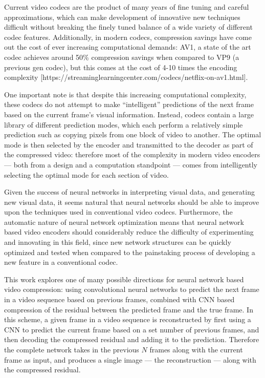 \documentclass[10pt,twocolumn,letterpaper]{article}
\begin{document}
Current video codecs are the product of many years of fine tuning and careful approximations, which can make development of innovative new techniques difficult without breaking the finely tuned balance of a wide variety of different codec features. Additionally, in modern codecs, compression savings have come out the cost of ever increasing computational demands: AV1, a state of the art codec achieves around 50\% compression savings when compared to VP9 (a previous gen codec), but this comes at the cost of 4-10 times the encoding complexity [https://streaminglearningcenter.com/codecs/netflix-on-av1.html].

One important note is that despite this increasing computational complexity, these codecs do not attempt to make ``intelligent'' predictions of the next frame based on the current frame's visual information. Instead, codecs contain a large library of different prediction modes, which each perform a relatively simple prediction such as copying pixels from one block of video to another. The optimal mode is then selected by the encoder and transmitted to the decoder as part of the compressed video: therefore most of the complexity in modern video encoders --- both from a design and a computation standpoint --- comes from intelligently selecting the optimal mode for each section of video.

Given the success of neural networks in interpreting visual data, and generating new visual data, it seems natural that neural networks should be able to improve upon the techniques used in conventional video codecs. Furthermore, the automatic nature of neural network optimization means that neural network based video encoders should considerably reduce the difficulty of experimenting and innovating in this field, since new network structures can be quickly optimized and tested when compared to the painstaking process of developing a new feature in a conventional codec.

This work explores one of many possible directions for neural network based video compression: using convolutional neural networks to predict the next frame in a video sequence based on previous frames, combined with CNN based compression of the residual between the predicted frame and the true frame. In this scheme, a given frame in a video sequence is reconstructed by first using a CNN to predict the current frame based on a set number of previous frames, and then decoding the compressed residual and adding it to the prediction. Therefore the complete network takes in the previous $N$ frames along with the current frame as input, and produces a single image --- the reconstruction --- along with the compressed residual.
\end{document}
